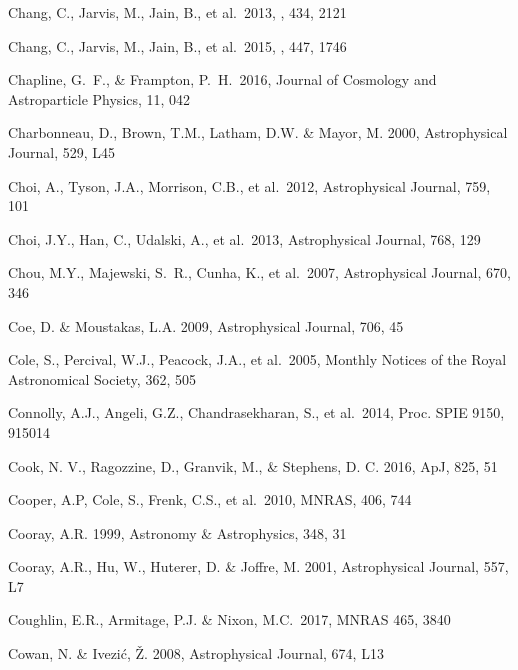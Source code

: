 \documentclass[twocolumn]{aastex61}
\begin{document}
\begin{thebibliography}{}
 Chang, C., Jarvis, M., Jain, B., et al.\ 2013, \mnras, 434, 2121

 Chang, C., Jarvis, M., Jain, B., et al.\ 2015, \mnras, 447, 1746

 Chapline, G.~F., \& Frampton, P.~H.\ 2016, Journal of Cosmology and Astroparticle Physics, 11, 042

 Charbonneau, D., Brown, T.M., Latham, D.W. \& Mayor, M. 2000, Astrophysical Journal, 529, L45

 Choi, A., Tyson, J.A., Morrison, C.B., et al.~2012, Astrophysical Journal, 759, 101

 Choi, J.Y., Han, C., Udalski, A., et al.~2013, Astrophysical Journal, 768, 129

 Chou, M.Y., Majewski, S.~R., Cunha, K., et al.~2007, Astrophysical Journal, 670, 346

 Coe, D. \& Moustakas, L.A. 2009, Astrophysical Journal, 706, 45

 Cole, S., Percival, W.J., Peacock, J.A., et al.~2005, Monthly Notices of the Royal Astronomical Society, 362, 505

 Connolly, A.J., Angeli, G.Z., Chandrasekharan, S., et al.~2014, Proc. SPIE 9150, 915014

 Cook, N. V., Ragozzine, D., Granvik, M., \& Stephens, D. C. 2016, ApJ, 825, 51

 Cooper, A.P, Cole, S., Frenk, C.S., et al.~2010, MNRAS, 406, 744

 Cooray, A.R. 1999, Astronomy \& Astrophysics, 348, 31

 Cooray, A.R., Hu, W., Huterer, D. \& Joffre, M. 2001, Astrophysical Journal, 557, L7

 Coughlin, E.R., Armitage,  P.J. \&  Nixon, M.C.~2017, MNRAS 465, 3840

 Cowan, N. \& Ivezi\'{c}, \v{Z}. 2008, Astrophysical Journal, 674, L13


\end{thebibliography}
\end{document}
